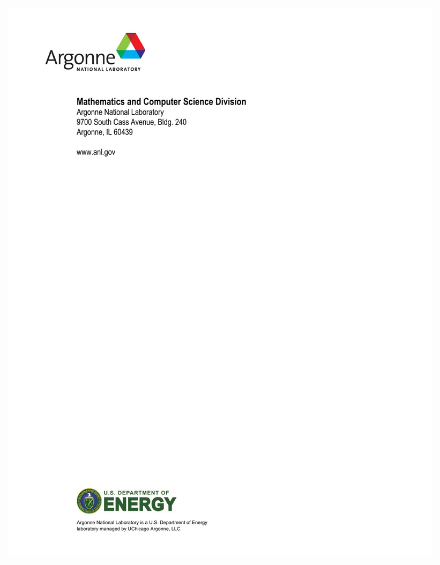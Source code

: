 \pagestyle{empty}
\begin{figure}[hbt]
\centerline{\includegraphics{ArgonneReportTemplate2018LastPage.pdf}}
\caption{}
\end{figure}


